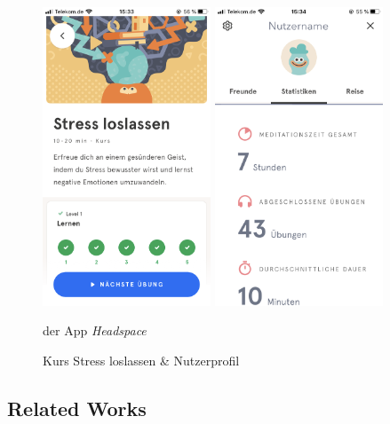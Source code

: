 \documentclass[10pt]{article}
\begin{document}
\begin{figure}[h]
 \centering
 \begin{minipage}[t]{0.45\linewidth} 
  \centering 
 \includegraphics[width=5cm,keepaspectratio]{headspace1}
  \end{minipage}
  \begin{minipage}[t]{0.45\linewidth} 
  \centering 
   \includegraphics[width=5cm,keepaspectratio]{headspace2}
  \end{minipage}
    \caption{Kurs Stress loslassen \& Nutzerprofil}  der App \textit{Headspace} 
   \label{fig:headspace}
\end{figure}


\subsection{Related Works}
\end{document}
